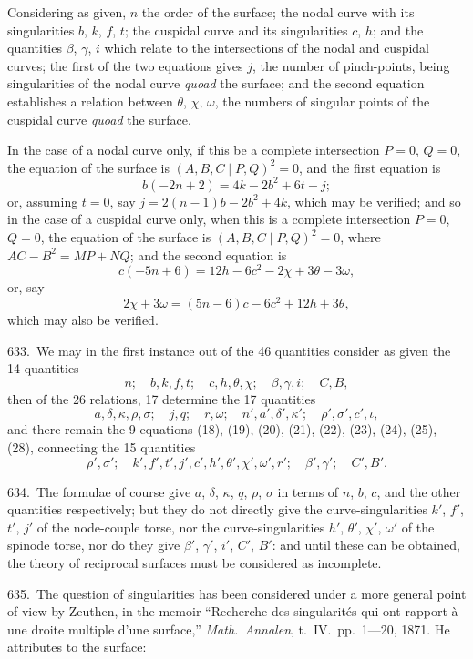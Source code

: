 \documentclass[11pt,a4paper]{article}
\theoremstyle{plain}
\theoremstyle{definition}
\theoremstyle{remark}
\begin{document}
Considering as given, $n$ the order of the surface; the nodal curve with its singularities $b$, $k$, $f$, $t$; the cuspidal curve and its singularities $c$, $h$; and the quantities $\beta$, $\gamma$, $i$ which relate to the intersections of the nodal and cuspidal curves; the first of the two equations gives $j$, the number of pinch-points, being singularities of the nodal curve \textit{quoad} the surface; and the second equation establishes a relation between $\theta$, $\chi$, $\omega$, the numbers of singular points of the cuspidal curve \textit{quoad} the surface.

In the case of a nodal curve only, if this be a complete intersection $P=0$, $Q=0$, the equation of the surface is $(A,B,C\mid P,Q)^2=0$, and the first equation is
\[
b(-2n+2)=4k-2b^2+6t-j;
\]
or, assuming $t=0$, say $j=2(n-1)b-2b^2+4k$, which may be verified; and so in the case of a cuspidal curve only, when this is a complete intersection $P=0$, $Q=0$, the equation of the surface is $(A,B,C\mid P,Q)^2=0$, where $AC-B^2=MP+NQ$; and the second equation is
\[
c(-5n+6)=12h-6c^2-2\chi+3\theta-3\omega,
\]
or, say
\[
2\chi+3\omega=(5n-6)c-6c^2+12h+3\theta,
\]
which may also be verified.

\newpage
\setcounter{page}{619}

633.\ We may in the first instance out of the 46 quantities consider as given the 14 quantities
\[
n;\quad b,k,f,t;\quad c,h,\theta,\chi;\quad \beta,\gamma,i;\quad C,B,
\]
then of the 26 relations, 17 determine the 17 quantities
\[
a,\delta,\kappa,\rho,\sigma;\quad j,q;\quad r,\omega;\quad n',a',\delta',\kappa';\quad \rho',\sigma',c',\iota,
\]
and there remain the 9 equations (18), (19), (20), (21), (22), (23), (24), (25), (28), connecting the 15 quantities
\[
\rho',\sigma';\quad k',f',t',j',c',h',\theta',\chi',\omega',r';\quad \beta',\gamma';\quad C',B'.
\]

634.\ The formulae of course give $a$, $\delta$, $\kappa$, $q$, $\rho$, $\sigma$ in terms of $n$, $b$, $c$, and the other quantities respectively; but they do not directly give the curve-singularities $k'$, $f'$, $t'$, $j'$ of the node-couple torse, nor the curve-singularities $h'$, $\theta'$, $\chi'$, $\omega'$ of the spinode torse, nor do they give $\beta'$, $\gamma'$, $i'$, $C'$, $B'$: and until these can be obtained, the theory of reciprocal surfaces must be considered as incomplete.

635.\ The question of singularities has been considered under a more general point of view by Zeuthen, in the memoir ``Recherche des singularit\'{e}s qui ont rapport \`{a} une droite multiple d'une surface,'' \textit{Math.\ Annalen}, t.~IV.\ pp.~1---20, 1871. He attributes to the surface:
\end{document}
